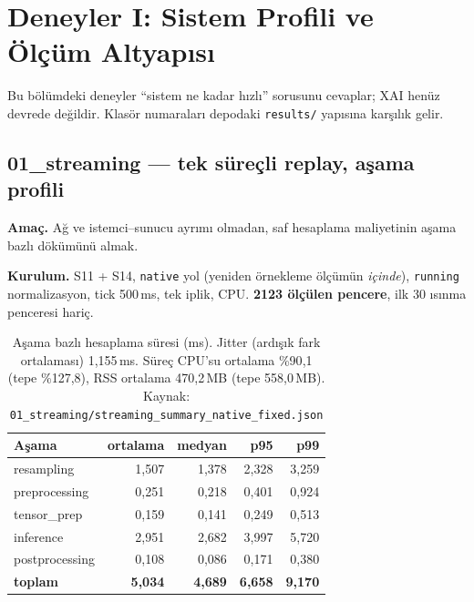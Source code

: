 \documentclass[11pt,a4paper]{report}
\newcommand{\ms}{\,ms}
\newcommand{\kod}[1]{\texttt{\small #1}}
\newcommand{\dosya}[1]{\texttt{\footnotesize #1}}
\begin{document}
\chapter{Deneyler I: Sistem Profili ve Ölçüm Altyapısı}

Bu bölümdeki deneyler ``sistem ne kadar hızlı'' sorusunu cevaplar; XAI henüz
devrede değildir. Klasör numaraları depodaki \dosya{results/} yapısına karşılık
gelir.

\section{01\_streaming --- tek süreçli replay, aşama profili}

\textbf{Amaç.} Ağ ve istemci--sunucu ayrımı olmadan, saf hesaplama maliyetinin
aşama bazlı dökümünü almak.

\textbf{Kurulum.} S11 + S14, \kod{native} yol (yeniden örnekleme ölçümün
\emph{içinde}), \kod{running} normalizasyon, tick 500\ms, tek iplik, CPU.
\textbf{2123 ölçülen pencere}, ilk 30 ısınma penceresi hariç.

\begin{table}[H]
\centering\small
\begin{tabular}{@{}lrrrr@{}}
\toprule
\textbf{Aşama} & \textbf{ortalama} & \textbf{medyan} & \textbf{p95} & \textbf{p99} \\
\midrule
resampling      & 1{,}507 & 1{,}378 & 2{,}328 & 3{,}259 \\
preprocessing   & 0{,}251 & 0{,}218 & 0{,}401 & 0{,}924 \\
tensor\_prep    & 0{,}159 & 0{,}141 & 0{,}249 & 0{,}513 \\
inference       & 2{,}951 & 2{,}682 & 3{,}997 & 5{,}720 \\
postprocessing  & 0{,}108 & 0{,}086 & 0{,}171 & 0{,}380 \\
\midrule
\textbf{toplam} & \textbf{5{,}034} & \textbf{4{,}689} & \textbf{6{,}658} & \textbf{9{,}170} \\
\bottomrule
\end{tabular}
\caption{Aşama bazlı hesaplama süresi (ms). Jitter (ardışık fark ortalaması)
1{,}155\ms. Süreç CPU'su ortalama \%90{,}1 (tepe \%127{,}8), RSS ortalama
470{,}2\,MB (tepe 558{,}0\,MB).
Kaynak: \dosya{01\_streaming/streaming\_summary\_native\_fixed.json}}
\end{table}
\end{document}
